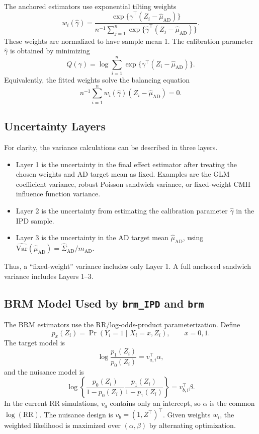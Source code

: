 \documentclass[11pt,a4paper]{article}
\begin{document}
The anchored estimators use exponential tilting weights
\[
  w_i(\widehat\gamma)
  =
  \frac{\exp\{\widehat\gamma^\top(Z_i-\widehat\mu_{\mathrm{AD}})\}}
       {n^{-1}\sum_{j=1}^n
       \exp\{\widehat\gamma^\top(Z_j-\widehat\mu_{\mathrm{AD}})\}} .
\]
These weights are normalized to have sample mean 1.  The calibration parameter
\(\widehat\gamma\) is obtained by minimizing
\[
  Q(\gamma)
  =
  \log\sum_{i=1}^n
  \exp\{\gamma^\top(Z_i-\widehat\mu_{\mathrm{AD}})\}.
\]
Equivalently, the fitted weights solve the balancing equation
\[
  n^{-1}\sum_{i=1}^n
  w_i(\widehat\gamma)(Z_i-\widehat\mu_{\mathrm{AD}})=0.
\]

\subsection{Uncertainty Layers}

For clarity, the variance calculations can be described in three layers.

\begin{itemize}
\item Layer 1 is the uncertainty in the final effect estimator after treating
the chosen weights and AD target mean as fixed.  Examples are the GLM coefficient
variance, robust Poisson sandwich variance, or fixed-weight CMH influence
function variance.
\item Layer 2 is the uncertainty from estimating the calibration parameter
\(\widehat\gamma\) in the IPD sample.
\item Layer 3 is the uncertainty in the AD target mean
\(\widehat\mu_{\mathrm{AD}}\), using
\(\widehat{\mathrm{Var}}(\widehat\mu_{\mathrm{AD}})
=\widehat\Sigma_{\mathrm{AD}}/m_{\mathrm{AD}}\).
\end{itemize}

Thus, a ``fixed-weight'' variance includes only Layer 1.  A full anchored
sandwich variance includes Layers 1--3.

\subsection{BRM Model Used by \texttt{brm\_IPD} and \texttt{brm}}

The BRM estimators use the RR/log-odds-product parameterization.  Define
\[
  p_x(Z_i)=\Pr(Y_i=1\mid X_i=x,Z_i),\qquad x=0,1.
\]
The target model is
\[
  \log\frac{p_1(Z_i)}{p_0(Z_i)}
  =
  v_{a,i}^{\top}\alpha ,
\]
and the nuisance model is
\[
  \log\left\{
  \frac{p_0(Z_i)}{1-p_0(Z_i)}
  \frac{p_1(Z_i)}{1-p_1(Z_i)}
  \right\}
  =
  v_{b,i}^{\top}\beta .
\]
In the current RR simulations, \(v_a\) contains only an intercept, so
\(\alpha\) is the common \(\log(\mathrm{RR})\).  The nuisance design is
\(v_b=(1,Z^\top)^\top\).  Given weights \(w_i\), the weighted likelihood is
maximized over \((\alpha,\beta)\) by alternating optimization.
\end{document}
